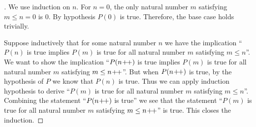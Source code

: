 \begin{proof}[]
  We use induction on \(n\).
  For \(n = 0\), the only natural number \(m\) satisfying \(m \leq n = 0\) is \(0\).
  By hypothesis \(P(0)\) is true.
  Therefore, the base case holds trivially.

  Suppose inductively that for some natural number \(n\) we have the implication ``\(P(n)\) is true implies \(P(m)\) is true for all natural number \(m\) satisfying \(m \leq n\)''.
  We want to show the implication ``\(P(n\!+\!\!+)\) is true implies \(P(m)\) is true for all natural number \(m\) satisfying \(m \leq n\!+\!\!+\)''.
  But when \(P(n\!+\!\!+)\) is true, by the hypothesis of \(P\) we know that \(P(n)\) is true.
  Thus we can apply induction hypothesis to derive ``\(P(m)\) is true for all natural number \(m\) satisfying \(m \leq n\)''.
  Combining the statement ``\(P(n\!+\!\!+)\) is true'' we see that the statement ``\(P(m)\) is true for all natural number \(m\) satisfying \(m \leq n\!+\!\!+\)'' is true.
  This closes the induction.
\end{proof}
